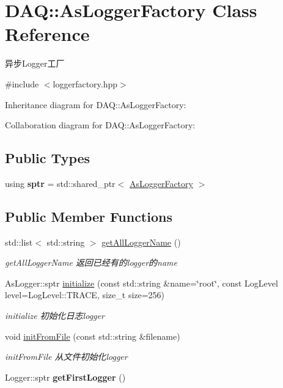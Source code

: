 \hypertarget{classDAQ_1_1AsLoggerFactory}{}\section{D\+AQ\+:\+:As\+Logger\+Factory Class Reference}
\label{classDAQ_1_1AsLoggerFactory}


异步\+Logger工厂  




{\ttfamily \#include $<$loggerfactory.\+hpp$>$}



Inheritance diagram for D\+AQ\+:\+:As\+Logger\+Factory\+:


Collaboration diagram for D\+AQ\+:\+:As\+Logger\+Factory\+:
\subsection*{Public Types}
\begin{DoxyCompactItemize}
\item 
\mbox{\label{classDAQ_1_1AsLoggerFactory_a3eea75d65f6ed55dcf02c326c825fde1}} 
using {\bfseries sptr} = std\+::shared\+\_\+ptr$<$ \hyperlink{classDAQ_1_1AsLoggerFactory}{As\+Logger\+Factory} $>$
\end{DoxyCompactItemize}
\subsection*{Public Member Functions}
\begin{DoxyCompactItemize}
\item 
std\+::list$<$ std\+::string $>$ \hyperlink{classDAQ_1_1AsLoggerFactory_abf012054eb30ba4005c67c662d88b669}{get\+All\+Logger\+Name} ()
\begin{DoxyCompactList}\small\item\em get\+All\+Logger\+Name 返回已经有的logger的name \end{DoxyCompactList}\item 
As\+Logger\+::sptr \hyperlink{classDAQ_1_1AsLoggerFactory_a2c16870de91b9892909b302f819ff90e}{initialize} (const std\+::string \&name=\char`\"{}root\char`\"{}, const Log\+Level level=Log\+Level\+::\+T\+R\+A\+CE, size\+\_\+t size=256)
\begin{DoxyCompactList}\small\item\em initialize 初始化日志logger \end{DoxyCompactList}\item 
void \hyperlink{classDAQ_1_1AsLoggerFactory_aec800700a5d059c0f10574bf2fdd5784}{init\+From\+File} (const std\+::string \&filename)
\begin{DoxyCompactList}\small\item\em init\+From\+File 从文件初始化logger \end{DoxyCompactList}\item 
\mbox{\label{classDAQ_1_1AsLoggerFactory_ac1b2f014fb7252e3942f4f3632354911}} 
Logger\+::sptr {\bfseries get\+First\+Logger} ()
\end{DoxyCompactItemize}
